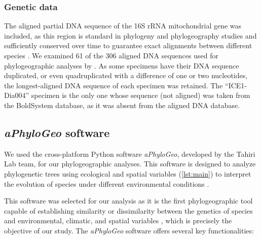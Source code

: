 \subsubsection{Genetic data}
The aligned partial DNA sequence of the 16S rRNA mitochondrial gene was included, as this region is standard in phylogeny and phylogeography studies \citep{hugenholtz1998impact} and sufficiently conserved over time to guarantee exact alignments between different species \citep{saccone1999evolutionary}. We examined 61 of the 306 aligned DNA sequences used for phylogeographic analyses by \citep{uhlir_adding_2021}. As some specimens have their DNA sequence duplicated, or even quadruplicated with a difference of one or two nucleotides, the longest-aligned DNA sequence of each specimen was retained. The ``ICE1-Dia004'' specimen is the only one whose sequence (not aligned) was taken from the BoldSystem database, as it was absent from the \citep{uhlir_adding_2021} aligned DNA database.

\subsection{{\textit{aPhyloGeo} software}\label{aPhyloGeo-software}}
We used the cross-platform Python software \textit{aPhyloGeo}, developed by the Tahiri Lab team, for our phylogeographic analyses. This software is designed to analyze phylogenetic trees using ecological and spatial variables (\autoref{lst:main}) to interpret the evolution of species under different environmental conditions \citep{li2024host, li2023aphylogeo, koshkarov_phylogeography_2022}.

This software was selected for our analysis as it is the first phylogeographic tool capable of establishing similarity or dissimilarity between the genetics of species and environmental, climatic, and spatial variables \citep{li2024host, li2023aphylogeo, koshkarov_phylogeography_2022}, which is precisely the objective of our study. The \textit{aPhyloGeo} software offers several key functionalities:

